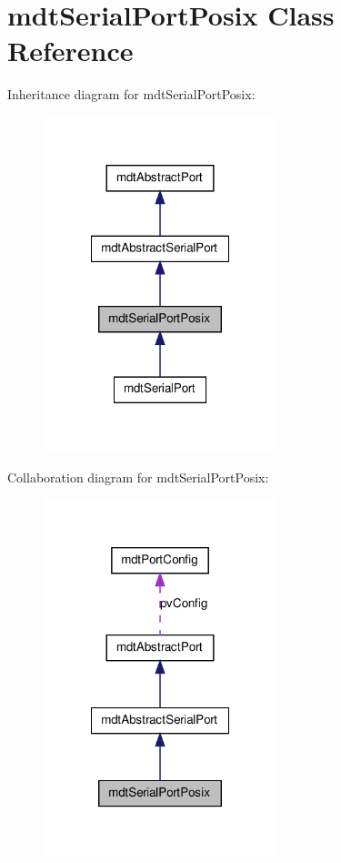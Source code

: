 \hypertarget{classmdt_serial_port_posix}{
\section{mdtSerialPortPosix Class Reference}
\label{classmdt_serial_port_posix}
}


Inheritance diagram for mdtSerialPortPosix:\nopagebreak
\begin{figure}[H]
\begin{center}
\leavevmode
\includegraphics[width=192pt]{classmdt_serial_port_posix__inherit__graph}
\end{center}
\end{figure}


Collaboration diagram for mdtSerialPortPosix:\nopagebreak
\begin{figure}[H]
\begin{center}
\leavevmode
\includegraphics[width=192pt]{classmdt_serial_port_posix__coll__graph}
\end{center}
\end{figure}
